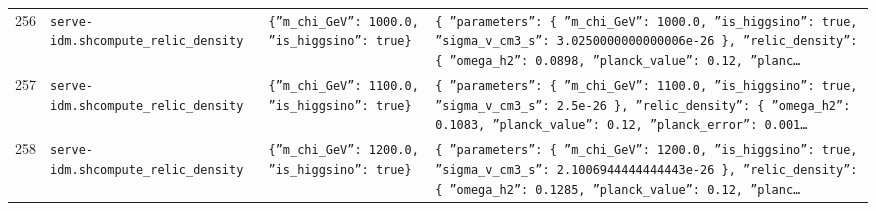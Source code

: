 \documentclass[11pt,a4paper]{article}
\begin{document}
\begin{longtable}{@{}p{}p{}p{}p{}@{}}
256 & \texttt{serve-idm.sh}\newline\texttt{compute\_\allowbreak{}relic\_\allowbreak{}density} & \texttt{\{''m\_\allowbreak{}chi\_\allowbreak{}GeV'':\allowbreak{} 1000.0,\allowbreak{} ''is\_\allowbreak{}higgsino'':\allowbreak{} true\}\allowbreak{}} & \texttt{\{   ''parameters'':\allowbreak{} \{     ''m\_\allowbreak{}chi\_\allowbreak{}GeV'':\allowbreak{} 1000.0,\allowbreak{}     ''is\_\allowbreak{}higgsino'':\allowbreak{} true,\allowbreak{}     ''sigma\_\allowbreak{}v\_\allowbreak{}cm3\_\allowbreak{}s'':\allowbreak{} 3.0250000000000006e-26   \}\allowbreak{},\allowbreak{}   ''relic\_\allowbreak{}density'':\allowbreak{} \{     ''omega\_\allowbreak{}h2'':\allowbreak{} 0.0898,\allowbreak{}     ''planck\_\allowbreak{}value'':\allowbreak{} 0.12,\allowbreak{}     ''planc\ldots{}\allowbreak{}} \\
257 & \texttt{serve-idm.sh}\newline\texttt{compute\_\allowbreak{}relic\_\allowbreak{}density} & \texttt{\{''m\_\allowbreak{}chi\_\allowbreak{}GeV'':\allowbreak{} 1100.0,\allowbreak{} ''is\_\allowbreak{}higgsino'':\allowbreak{} true\}\allowbreak{}} & \texttt{\{   ''parameters'':\allowbreak{} \{     ''m\_\allowbreak{}chi\_\allowbreak{}GeV'':\allowbreak{} 1100.0,\allowbreak{}     ''is\_\allowbreak{}higgsino'':\allowbreak{} true,\allowbreak{}     ''sigma\_\allowbreak{}v\_\allowbreak{}cm3\_\allowbreak{}s'':\allowbreak{} 2.5e-26   \}\allowbreak{},\allowbreak{}   ''relic\_\allowbreak{}density'':\allowbreak{} \{     ''omega\_\allowbreak{}h2'':\allowbreak{} 0.1083,\allowbreak{}     ''planck\_\allowbreak{}value'':\allowbreak{} 0.12,\allowbreak{}     ''planck\_\allowbreak{}error'':\allowbreak{} 0.001\ldots{}\allowbreak{}} \\
258 & \texttt{serve-idm.sh}\newline\texttt{compute\_\allowbreak{}relic\_\allowbreak{}density} & \texttt{\{''m\_\allowbreak{}chi\_\allowbreak{}GeV'':\allowbreak{} 1200.0,\allowbreak{} ''is\_\allowbreak{}higgsino'':\allowbreak{} true\}\allowbreak{}} & \texttt{\{   ''parameters'':\allowbreak{} \{     ''m\_\allowbreak{}chi\_\allowbreak{}GeV'':\allowbreak{} 1200.0,\allowbreak{}     ''is\_\allowbreak{}higgsino'':\allowbreak{} true,\allowbreak{}     ''sigma\_\allowbreak{}v\_\allowbreak{}cm3\_\allowbreak{}s'':\allowbreak{} 2.1006944444444443e-26   \}\allowbreak{},\allowbreak{}   ''relic\_\allowbreak{}density'':\allowbreak{} \{     ''omega\_\allowbreak{}h2'':\allowbreak{} 0.1285,\allowbreak{}     ''planck\_\allowbreak{}value'':\allowbreak{} 0.12,\allowbreak{}     ''planc\ldots{}\allowbreak{}} \\

\end{longtable}
\end{document}
